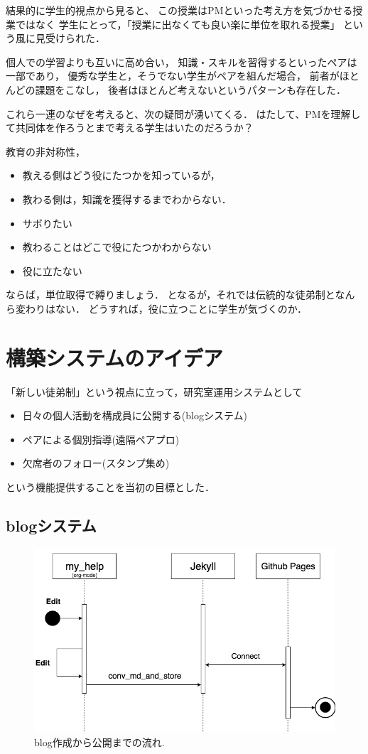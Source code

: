 \documentclass[a4,p11]{article}
\begin{document}
結果的に学生的視点から見ると、
この授業はPMといった考え方を気づかせる授業ではなく
学生にとって，「授業に出なくても良い楽に単位を取れる授業」
という風に見受けられた．

個人での学習よりも互いに高め合い，
知識・スキルを習得するといったペアは一部であり，
優秀な学生と，そうでない学生がペアを組んだ場合，
前者がほとんどの課題をこなし，
後者はほとんど考えないというパターンも存在した．

これら一連のなぜを考えると、次の疑問が湧いてくる．
はたして、PMを理解して共同体を作ろうとまで考える学生はいたのだろうか？

教育の非対称性，
\begin{itemize}
\item 教える側はどう役にたつかを知っているが，
\item 教わる側は，知識を獲得するまでわからない．

\item サボりたい
\item 教わることはどこで役にたつかわからない
\item 役に立たない
\end{itemize}

ならば，単位取得で縛りましょう．
となるが，それでは伝統的な徒弟制となんら変わりはない．
どうすれば，役に立つことに学生が気づくのか．

\section{構築システムのアイデア}
\label{sec:orga818008}
「新しい徒弟制」という視点に立って，研究室運用システムとして
\begin{itemize}
\item 日々の個人活動を構成員に公開する(blogシステム)
\item ペアによる個別指導(遠隔ペアプロ)
\item 欠席者のフォロー(スタンプ集め)
\end{itemize}
という機能提供することを当初の目標とした．

\subsection{blogシステム}
\label{sec:orga88773b}

\begin{figure}[htbp]
\centering
\includegraphics[width=.9\linewidth]{./images/myhelp_to_jekyll.png}
\caption{\label{fig:org5643fb8}
blog作成から公開までの流れ.}
\end{figure}
\end{document}

